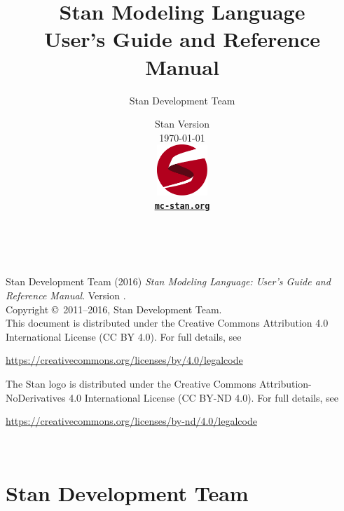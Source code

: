 \title{\Huge\bf Stan Modeling Language \\[4pt] {\LARGE User's Guide
    and Reference Manual}}
\author{Stan Development Team}

\date{\vspace*{36pt} Stan Version \stanversion
\\[8pt] {\small \today}
\\[36pt]
{
\vfill
\includegraphics[width=0.75in]{img/stanlogo-main.pdf}}
\\
\vspace*{6pt}
{\bfseries \href{http://mc-stan.org/}{\tt mc-stan.org}}
}
\maketitle

\newpage
\thispagestyle{empty}
\mbox{ }
\vfill
\begin{center}
\begin{minipage}[t]{0.75\textwidth}
\small
Stan Development Team (2016)
{\it Stan Modeling Language: User's Guide and Reference Manual}. Version
\stanversion.
\vspace*{20pt}
\mbox{ }
\\
Copyright \copyright \ 2011--2016, Stan Development Team.
\vspace*{28pt}
\mbox{} \\
This document is distributed under the Creative Commons Attribution 4.0
International License (CC BY 4.0).  For full details, see
\begin{center}
\url{https://creativecommons.org/licenses/by/4.0/legalcode}
\end{center}
The Stan logo is distributed under the Creative Commons Attribution-NoDerivatives
4.0 International License (CC BY-ND 4.0).  For full details, see
\begin{center}
\url{https://creativecommons.org/licenses/by-nd/4.0/legalcode}
\end{center}
\end{minipage}
\vspace*{24pt}
\mbox{ }
\end{center}

\newpage
\section*{Stan Development Team}

